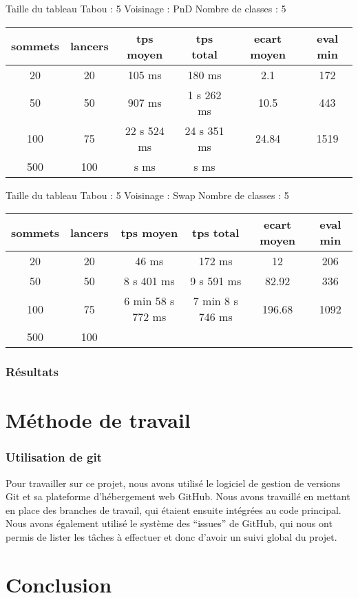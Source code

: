 \documentclass[12pt]{article}
\begin{document}
Taille du tableau Tabou : 5
Voisinage : PnD
Nombre de classes : 5

\begin{tabular}{|c|c|c|c|c|c|}
	\hline 
	sommets & lancers & tps moyen & tps total & ecart moyen & eval min\\
	\hline
	20 & 20 & 105 ms & 180 ms & 2.1 & 172 \\
	\hline
	 50  &  50  &   907  ms   &  1  s  262  ms   &   10.5  &   443  \\
	\hline
	 100  &  75  & 22 s 524  ms   &  24 s  351  ms    &  24.84   &   1519  \\
	\hline
	 500  &  100  &   s   ms  &    s    ms   &     &     \\
	\hline
\end{tabular}
\bigskip

Taille du tableau Tabou : 5
Voisinage : Swap
Nombre de classes : 5

\begin{tabular}{|c|c|c|c|c|c|}
	\hline 
	sommets & lancers & tps moyen & tps total & ecart moyen & eval min\\
	\hline
	20 & 20 & 46 ms & 172  ms & 12 & 206 \\
	\hline
	 50  &  50  &   8 s 401  ms   &  9  s 591   ms   &  82.92   &   336  \\
	\hline
	 100  &  75  & 6 min 58 s 772    ms  & 7 min 8 s 746   ms   &  196.68   &   1092 \\
	\hline
	 500  &  100  &    &   &   &  \\
	\hline
\end{tabular}

\section{Résultats}

\newpage

\part{Méthode de travail}
\section{Utilisation de git}
Pour travailler sur ce projet, nous avons utilisé le logiciel de gestion de versions Git et sa plateforme d’hébergement web GitHub. Nous avons travaillé en mettant en place des branches de travail, qui étaient ensuite intégrées au code principal. Nous avons également utilisé le système des “issues” de GitHub, qui nous ont permis de lister les tâches à effectuer et donc d’avoir un suivi global du projet.

\part{Conclusion}
		
\end{document}
